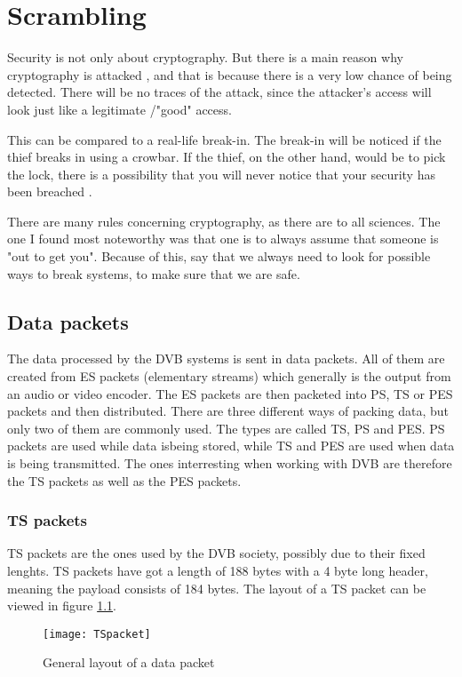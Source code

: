 \chapter{Scrambling}\label{ch:Scrambling}
Security is not only about cryptography. But there is a main reason why 
cryptography is attacked , and that is because there is a very low chance 
of being detected. There will be no traces of the attack, since the attacker’s 
access will look just like a legitimate /"good" access. 

This can be compared to a real-life break-in. The break-in will be noticed if 
the thief breaks in using a crowbar. If the thief, on the other hand, would be 
to pick the lock, there is a possibility that you will never notice that your 
security has been breached \citep{Schneier:2003}.

There are many rules concerning cryptography, as there are to all sciences. 
The one I found most noteworthy was that one is to always assume that someone 
is "out to get you". Because of this, \citet[pp. 12--14]{Schneier:2003} say that 
we always need  to look for possible ways to break systems, to make sure that
we are safe.

\section{Data packets}\label{sec:Data}
The data processed by the DVB systems is sent in data packets. All of them are 
created from ES packets (elementary streams) which generally is the output from 
an audio or video encoder. The ES packets are then packeted into PS, TS or PES 
packets and then distributed. There are three different ways of packing data, 
but only two of them are commonly used. The types are called TS, PS and PES. PS 
packets are used while data isbeing stored, while TS and PES are used when data 
is being transmitted. The ones interresting when working with DVB are therefore 
the TS packets as well as the PES packets.

\subsection{TS packets}
TS packets are the ones used by the DVB society, possibly due to their fixed 
lenghts. TS packets have got a length of 188 bytes with a 4 byte long header, 
meaning the payload consists of 184 bytes. The layout of a TS packet can be 
viewed in figure \ref{img:Package}.

\begin{figure}
  \texttt{[image: TSpacket]}
  \caption{General layout of a data packet \citep{DVB:2013}}
  \label{img:Package}
\end{figure}

